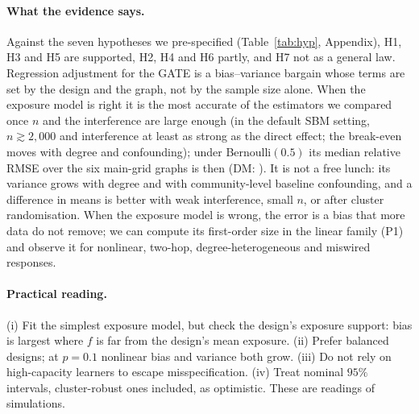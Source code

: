 \paragraph{What the evidence says.}
Against the seven hypotheses we pre-specified (Table~\ref{tab:hyp}, Appendix), H1, H3 and H5 are supported, H2, H4 and H6 partly, and H7 not as a general law.
Regression adjustment for the GATE is a bias--variance bargain whose terms are set by the design and the graph, not by the sample size alone. When the exposure model is right it is the most accurate of the estimators we compared once $n$ and the interference are large enough (in the default SBM setting, $n\gtrsim2{,}000$ and interference at least as strong as the direct effect; the break-even moves with degree and confounding); under Bernoulli$(0.5)$ its median relative RMSE over the six main-grid graphs is then \MainOneOls{} (DM: \MainDM). It is not a free lunch: its variance grows with degree and with community-level baseline confounding, and a difference in means is better with weak interference, small $n$, or after cluster randomisation. When the exposure model is wrong, the error is a bias that more data do not remove; we can compute its first-order size in the linear family (P1) and observe it for nonlinear, two-hop, degree-heterogeneous and miswired responses.
\paragraph{Practical reading.} (i) Fit the simplest exposure model, but check the design's exposure support: bias is largest where $f$ is far from the design's mean exposure. (ii) Prefer balanced designs; at $p=0.1$ nonlinear bias and variance both grow. (iii) Do not rely on high-capacity learners to escape misspecification. (iv) Treat nominal $95\%$ intervals, cluster-robust ones included, as optimistic. These are readings of simulations.
